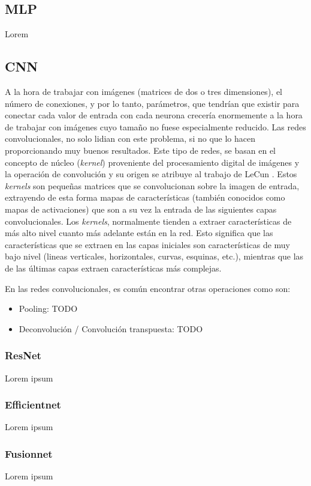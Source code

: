 \subsection{MLP}
Lorem

\subsection{CNN}
A la hora de trabajar con imágenes (matrices de dos o tres dimensiones), el número de conexiones, y por lo tanto, parámetros, que tendrían que existir para conectar cada valor de entrada con cada neurona crecería enormemente a la hora de trabajar con imágenes cuyo tamaño no fuese especialmente reducido. Las redes convolucionales, no solo lidian con este problema, si no que lo hacen proporcionando muy buenos resultados. Este tipo de redes, se basan en el concepto de núcleo (\textit{kernel}) proveniente del procesamiento digital de imágenes y la operación de convolución y su origen se atribuye al trabajo de LeCun \cite{}. Estos \textit{kernels} son pequeñas matrices que se convolucionan sobre la imagen de entrada, extrayendo de esta forma mapas de características (también conocidos como mapas de activaciones) que son a su vez la entrada de las siguientes capas convolucionales. Los \textit{kernels}, normalmente tienden a extraer características de más alto nivel cuanto más adelante están en la red. Esto significa que las características que se extraen en las capas iniciales son características de muy bajo nivel (lineas verticales, horizontales, curvas, esquinas, etc.), mientras que las de las últimas capas extraen características más complejas.

En las redes convolucionales, es común encontrar otras operaciones como son:
\begin{itemize}
\item Pooling: TODO
\item Deconvolución / Convolución transpuesta: TODO
\end{itemize}

\subsubsection{ResNet}
Lorem ipsum

\subsubsection{Efficientnet}
Lorem ipsum

\subsubsection{Fusionnet}
Lorem ipsum

